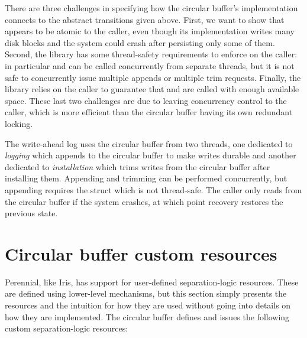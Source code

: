 There are three challenges in specifying how the circular buffer's
implementation connects to the abstract transitions given above. First, we
want to show that  appears to be atomic to the caller, even though
its implementation writes many disk blocks and the system could crash after
persisting only some of them. Second, the library has some thread-safety
requirements to enforce on the caller: in particular  and
 can be called concurrently from separate threads, but it is not
safe to concurrently issue multiple appends or multiple trim requests. Finally, the library
relies on the caller to guarantee that  and  are called with enough
available space. These last two challenges are due to leaving concurrency
control to the caller, which is more efficient than the circular buffer having
its own redundant locking.

The write-ahead log uses the circular buffer from two threads, one dedicated to
\emph{logging} which appends to the circular buffer to make writes durable and another
dedicated to \emph{installation} which trims writes from the circular buffer
after installing them. Appending and trimming can be performed concurrently, but
appending requires the  struct which is not thread-safe. The
caller only reads from the circular buffer if the system crashes, at which point
recovery restores the previous state.

\section{Circular buffer custom resources}

Perennial, like Iris, has support for user-defined separation-logic resources.
These are defined using lower-level mechanisms, but this section simply presents the
resources and the intuition for how they are used without going into details on
how they are implemented. The circular buffer defines and issues the
following custom separation-logic resources:

\newcommand{\circstate}{\cc{circ_state}}
\newcommand{\startIs}{\cc{start_is}}
\newcommand{\diskendIs}{\cc{end_is}}


